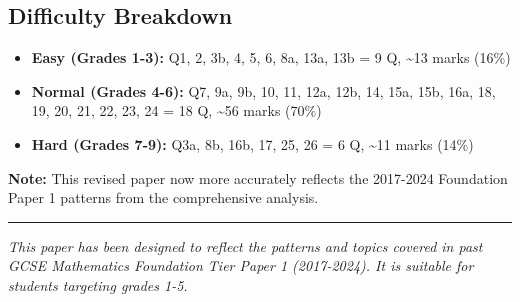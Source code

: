 \subsection{Difficulty Breakdown}\label{difficulty-breakdown}

\begin{itemize}
\tightlist
\item
  \textbf{Easy (Grades 1-3):} Q1, 2, 3b, 4, 5, 6, 8a, 13a, 13b = 9 Q,
  \textasciitilde13 marks (16\%)
\item
  \textbf{Normal (Grades 4-6):} Q7, 9a, 9b, 10, 11, 12a, 12b, 14, 15a,
  15b, 16a, 18, 19, 20, 21, 22, 23, 24 = 18 Q, \textasciitilde56 marks
  (70\%)
\item
  \textbf{Hard (Grades 7-9):} Q3a, 8b, 16b, 17, 25, 26 = 6 Q,
  \textasciitilde11 marks (14\%)
\end{itemize}

\textbf{Note:} This revised paper now more accurately reflects the
2017-2024 Foundation Paper 1 patterns from the comprehensive analysis.

\begin{center}\rule{0.5\linewidth}{0.5pt}\end{center}

\emph{This paper has been designed to reflect the patterns and topics
covered in past GCSE Mathematics Foundation Tier Paper 1 (2017-2024). It
is suitable for students targeting grades 1-5.}
